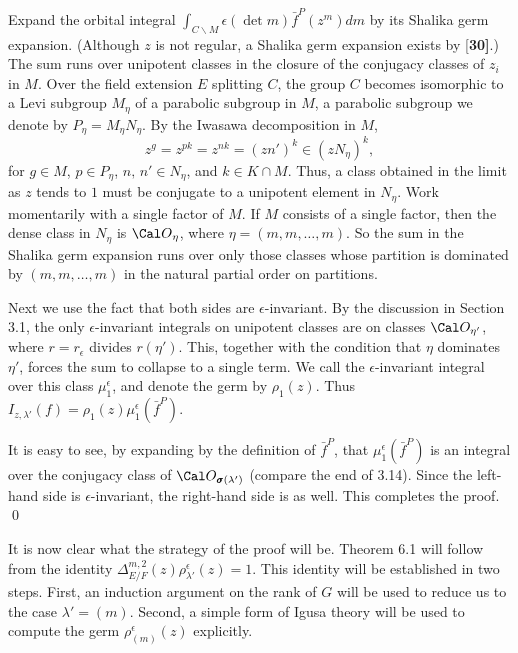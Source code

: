 Expand the orbital integral $\int_{C\backslash M}\epsilon(\det m) \bar f^P(z^m) dm$
by its Shalika germ expansion.  (Although $z$ is not regular, 
a Shalika germ expansion exists by {[\bf 30]}.)
The sum runs over unipotent classes in the closure of the conjugacy 
classes of $z_i$ in $M$.  Over the field extension $E$ splitting $C$,
the group $C$ becomes isomorphic to a Levi subgroup $M_\eta$ of a parabolic
subgroup in $M$, a parabolic subgroup we denote by $P_\eta = M_\eta N_\eta$.
By the Iwasawa decomposition in 
  $ M $,
%
$$
  z^g =
  z^{pk}=
  z^{nk} =
 (zn')^k \in 
  (z N_{\eta})^k,
 $$
  for $g \in M$, 
  $p \in P_{\eta}$, $n, \, n' \in N_{\eta}$, and
  $k \in K \cap M$.
Thus, a class obtained in the limit as $z$ tends to $1$ must be conjugate to a unipotent element in
  $ N_{\eta} $.
Work momentarily with a single factor of $M$.
If $ M$
consists of a single factor, then the dense class in $ N_{\eta} $ 
is 
  $ {\Cal O}_{\eta} $, where $ \eta = ( m, m,\dots ,  m) $.
So the sum in the Shalika germ expansion
runs over only those classes whose partition is dominated 
  by $ (m, m, \dots , m) $
in the
  natural partial order on partitions.

Next we use the fact that both sides are
  $ \epsilon $-invariant.
  By the discussion in Section 3.1, the
only
  $ \epsilon $-invariant 
integrals
on unipotent classes are on classes
  $ \Cal O_{\eta'} $,
where $r=r_\epsilon$ divides 
  $ r(\eta') $.
This, together with the condition that
  $ \eta $
dominates
  $ \eta' $,
forces the sum to collapse to a single term.
We call the $ \epsilon $-invariant integral over this class
  $ \mu_1^{\epsilon} $, and denote the germ by $ \rho_1 (z) $.  
  Thus $I_{z,\lambda'}(f) = \rho_1(z)\mu_1^\epsilon(\bar f^P)$.

It is easy to see, by expanding
by the definition of
  $ \bar f^{P} $,
that
  $ \mu_1^{\epsilon} 
    \left(
      \bar f^{P} 
    \right) $
is an integral over the conjugacy class of ${\Cal O}_{\pmb\sigma(\lambda')}$
(compare the end of 3.14).
Since the left-hand side is $\epsilon$-invariant, the right-hand
side is as well.  This completes the proof.
\qed\finishpproclaim
\bigskip


It is now clear what the strategy of the proof will be.  Theorem 6.1 will follow from
the identity $\Delta^{m,2}_{E/F}(z)\rho^\epsilon_{\lambda'}(z)=1$.  This identity will
be established in two steps.  First, an induction argument on the rank of $G$  will be used to
reduce us to the case $\lambda'=(m)$.   Second, a simple form of Igusa theory
will be used to compute the germ $\rho^\epsilon_{(m)}(z)$ explicitly.

